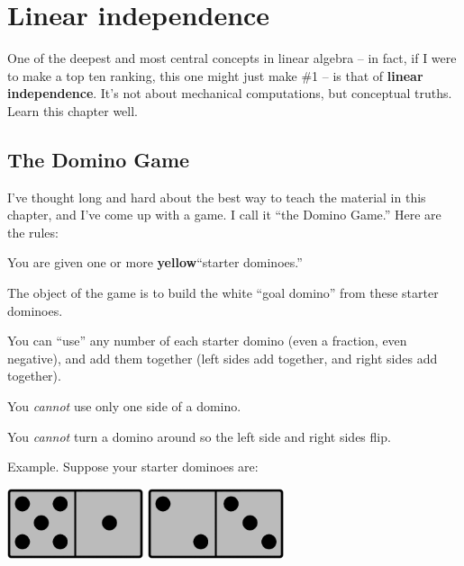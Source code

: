 

\chapter{Linear independence}


One of the deepest and most central concepts in linear algebra -- in fact, if I
were to make a top ten ranking, this one might just make \#1 -- is that of
\textbf{linear independence}. It's not about mechanical computations, but
conceptual truths. Learn this chapter well. 

\section{The Domino Game}

I've thought long and hard about the best way to teach the material in this
chapter, and I've come up with a game. I call it ``the Domino Game.'' Here are
the rules:

\begin{framed}
\begin{compactenum}
\item You are given one or more \textbf{yellow}\footnotemark ``starter dominoes.''
\item The object of the game is to build the white ``goal domino'' from these
starter dominoes.
\item You can ``use'' any number of each starter domino (even a fraction, even
negative), and add them together (left sides add together, and right sides add
together).
\item You \textit{cannot} use only one side of a domino.
\item You \textit{cannot} turn a domino around so the left side and right
sides flip.
\end{compactenum}
\end{framed}


Example. Suppose your starter dominoes are:

\begin{center}
\includegraphics[width=0.3\textwidth]{gray5_1.png}
\hspace{.3in}
\includegraphics[width=0.3\textwidth]{gray2_3.png}
\end{center}

